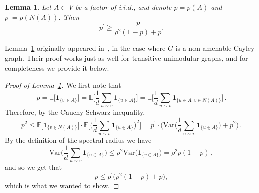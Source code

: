 \documentclass[11pt, reqno]{article}
\newtheorem{lemma}[thm]{Lemma}
\numberwithin{equation}{section}
\theoremstyle{definition}
\def\E{\mathbb{E}}
\newcommand{\1}{\mathds{1}}
\begin{document}
\begin{lemma}
    \label{lemma:lyons_nazarov_style_chebyshev}
    Let $A\subset V$ be a factor of i.i.d., and denote $p=p(A)$ and $p^\prime = p(N(A))$. Then
    \[
    p^\prime \ge \frac{p}{\rho^2(1-p) + p}.
    \] 
\end{lemma}
\noindent Lemma~\ref{lemma:lyons_nazarov_style_chebyshev} originally appeared in~\cite[Lemma~2.3]{lyons2011perfect}, in the case where $G$ is a non-amenable Cayley graph. Their proof works just as well for transitive unimodular graphs, and for completeness we provide it below.
\begin{proof}[Proof of Lemma~\ref{lemma:lyons_nazarov_style_chebyshev}]
    We first note that
    \begin{equation*}
        p = \E\big[\mathbf{1}_{\{v\in A\}}\big] = \E\Big[\frac{1}{d} \sum_{u\sim v} \mathbf{1}_{\{u\in A\}}\Big] = \E\Big[\frac{1}{d} \sum_{u\sim v} \mathbf{1}_{\{u\in A , v \in N(A) \}} \Big] \, . 
    \end{equation*}
    Therefore, by the Cauchy-Schwarz inequality, 
    \begin{equation*}
        p^2 \le \E\Big[ \mathbf{1}_{\{v\in N(A)\}}\Big] \cdot \E\Big[\Big(\frac{1}{d} \sum_{u\sim v} \mathbf{1}_{\{u\in A\}}\Big)^2\Big] = p^\prime \cdot \bigg(\text{Var}\Big(\frac{1}{d} \sum_{u\sim v} \mathbf{1}_{\{u\in A\}}\Big) + p^2\bigg) \, .
    \end{equation*}
    By the definition of the spectral radius we have
    \[
    \text{Var}\Big(\frac{1}{d} \sum_{u\sim v} \mathbf{1}_{\{u\in A\}}\Big) \le \rho^2 \text{Var}\big( \mathbf{1}_{\{v\in A\}}\big) = \rho^2 p (1-p) \, ,
    \]
    and so we get that
    \[
    p \le p^\prime\big(\rho^2(1-p) + p\big),
    \]
    which is what we wanted to show. 
\end{proof}
\end{document}
